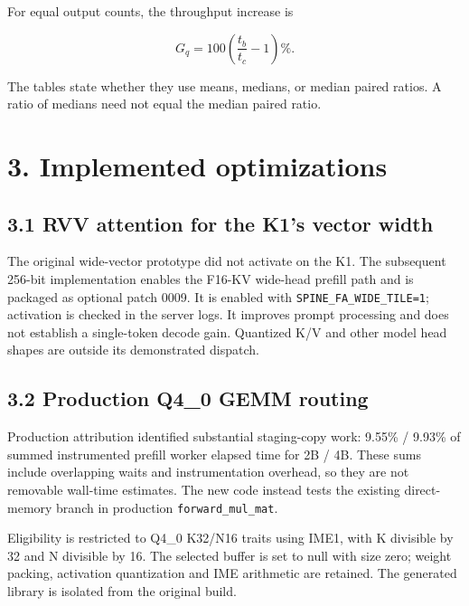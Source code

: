 \documentclass[10pt,a4paper]{article}
\begin{document}
For equal output counts, the throughput increase is

\[G_q = 100\left(\frac{t_b}{t_c}-1\right)\%. \]

The tables state whether they use means, medians, or median paired
ratios. A ratio of medians need not equal the median paired ratio.

\hypertarget{implemented-optimizations}{%
\section{3. Implemented optimizations}\label{implemented-optimizations}}

\hypertarget{rvv-attention-for-the-k1s-vector-width}{%
\subsection{3.1 RVV attention for the K1's vector
width}\label{rvv-attention-for-the-k1s-vector-width}}

The original wide-vector prototype did not activate on the K1. The
subsequent 256-bit implementation enables the F16-KV wide-head prefill
path and is packaged as optional patch 0009. It is enabled with
\nolinkurl{SPINE_FA_WIDE_TILE=1}; activation is checked in the server
logs. It improves prompt processing and does not establish a
single-token decode gain. Quantized K/V and other model head shapes are
outside its demonstrated dispatch.

\hypertarget{production-q4_0-gemm-routing}{%
\subsection{3.2 Production Q4\_0 GEMM
routing}\label{production-q4_0-gemm-routing}}

Production attribution identified substantial staging-copy work: 9.55\%
/ 9.93\% of summed instrumented prefill worker elapsed time for 2B / 4B.
These sums include overlapping waits and instrumentation overhead, so
they are not removable wall-time estimates. The new code instead tests
the existing direct-memory branch in production
\nolinkurl{forward_mul_mat}.

Eligibility is restricted to Q4\_0 K32/N16 traits using IME1, with K
divisible by 32 and N divisible by 16. The selected buffer is set to
null with size zero; weight packing, activation quantization and IME
arithmetic are retained. The generated library is isolated from the
original build.
\end{document}
